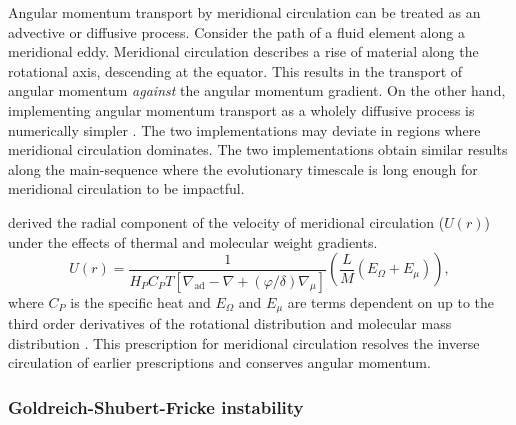 Angular momentum transport by meridional circulation can be treated as an advective or diffusive process.
Consider the path of a fluid element along a meridional eddy.
Meridional circulation describes a rise of material along the rotational axis, descending at the equator.
This results in the transport of angular momentum \textit{against} the angular momentum gradient.
On the other hand, implementing angular momentum transport as a wholely diffusive process is numerically simpler \citep{endal_evolution_1978,pinsonneault_evolutionary_1989,heger_presupernova_2000}.
The two implementations may deviate in regions where meridional circulation dominates.
The two implementations obtain similar results along the main-sequence \citep{talon_anisotropic_1997,heger_presupernova_2000} where the evolutionary timescale is long enough for meridional circulation to be impactful.

\citet{zahn_circulation_1992} derived the radial component of the velocity of meridional circulation ($U(r)$) under the effects of thermal and molecular weight gradients.
\begin{equation}
    U(r) = \frac{1}{H_P C_P T \left[ \nabla_{\text{ad}} - \nabla + \left( \varphi / \delta \right)\nabla_{\mu}\right]} \left( \frac{L}{M} \left(E_{\Omega} + E_{\mu}\right) \right),
    \label{eq:mr_u}
\end{equation}
where $C_P$ is the specific heat and $E_{\Omega}$ and $E_{\mu}$ are terms dependent on up to the third order derivatives of the rotational distribution and molecular mass distribution \citep[See][]{maeder_stellar_1998}.
This prescription for meridional circulation resolves the inverse circulation of earlier prescriptions and conserves angular momentum.




\subsubsection{Goldreich-Shubert-Fricke instability}

